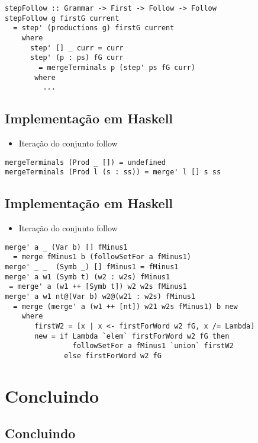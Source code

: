 \documentclass[11pt]{article}
\begin{document}
\begin{verbatim}
stepFollow :: Grammar -> First -> Follow -> Follow
stepFollow g firstG current
  = step' (productions g) firstG current
    where
      step' [] _ curr = curr
      step' (p : ps) fG curr
        = mergeTerminals p (step' ps fG curr)
       where
         ...
\end{verbatim}
\subsection*{Implementação em Haskell}
\label{sec:org60c15b2}

\begin{itemize}
\item Iteração do conjunto follow
\end{itemize}

\begin{verbatim}
mergeTerminals (Prod _ []) = undefined
mergeTerminals (Prod l (s : ss)) = merge' l [] s ss
\end{verbatim}
\subsection*{Implementação em Haskell}
\label{sec:org139ef9c}

\begin{itemize}
\item Iteração do conjunto follow
\end{itemize}

\begin{verbatim}
merge' a _ (Var b) [] fMinus1
  = merge fMinus1 b (followSetFor a fMinus1)
merge' _ _  (Symb _) [] fMinus1 = fMinus1
merge' a w1 (Symb t) (w2 : w2s) fMinus1
 = merge' a (w1 ++ [Symb t]) w2 w2s fMinus1
merge' a w1 nt@(Var b) w2@(w21 : w2s) fMinus1
  = merge (merge' a (w1 ++ [nt]) w21 w2s fMinus1) b new
    where
       firstW2 = [x | x <- firstForWord w2 fG, x /= Lambda]
       new = if Lambda `elem` firstForWord w2 fG then
                followSetFor a fMinus1 `union` firstW2
              else firstForWord w2 fG
\end{verbatim}
\section*{Concluindo}
\label{sec:orgee6d676}

\subsection*{Concluindo}
\label{sec:org18baf81}
\end{document}
